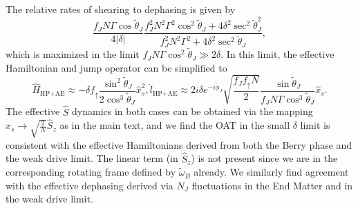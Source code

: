 \documentclass[11pt]{article}
\begin{document}
The relative rates of shearing to dephasing is given by
\begin{equation}
     \frac{ f_J N \Gamma \cos \tilde{\theta}_J}{ 4 |\delta|} \frac{f_J^2 N^2 \Gamma^2 \cos^2 \tilde{\theta}_J + 4 \delta^2 \sec^2 \tilde{\theta}_J^2}{f_J^2 N^2 \Gamma^2+4 \delta^2 \sec^2 \tilde{\theta}_J }, 
\end{equation}
which is maximized in the limit $f_J N \Gamma \cos^2 \tilde{\theta}_J \gg 2\delta$. In this limit, the effective Hamiltonian and jump operator can be simplified to
\begin{subequations}
    \begin{equation}
        \hat H_{\text{HP+AE}}\approx - \delta f_{\uparrow} \frac{\sin^2 \tilde{\theta}_J}{2 \cos^3 \tilde{\theta}_J} \hat x_s^2,
    \end{equation}
    \begin{equation}
        \hat l_{\text{HP+AE}} \approx 2 i \delta e^{- i \tilde{\phi}_J} \sqrt{\frac{f_J f_{\uparrow} N}{2}} \frac{\sin \tilde{\theta}_J}{ f_J N \Gamma \cos^3 \tilde{\theta}_J} \hat x_s.
    \end{equation}
\end{subequations}
The effective $\hat S$ dynamics in both cases can be obtained via the mapping $\hat x_s \to \sqrt{\frac{2}{N}} \hat S_z$ as in the main text, and we find the OAT in the small $\delta$ limit is consistent with the effective Hamiltonians derived from both the Berry phase and the weak drive limit. The linear term (in $\hat S_z$) is not present since we are in the corresponding rotating frame defined by $\tilde{\omega}_B$ already. We similarly find agreement with the effective dephasing derived via $N_J$ fluctuations in the End Matter and in the weak drive limit.
\end{document}
